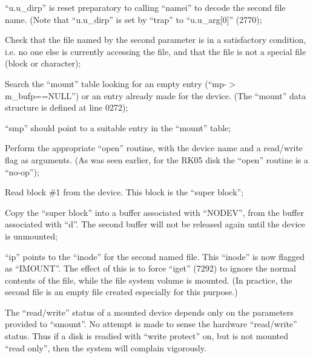 \item[6096:] ``u.u\_dirp'' is  reset  preparatory
to  calling ``namei'' to decode the
second  file  name.   (Note   that
``u.u\_dirp''  is  set  by ``trap'' to
``u.u\_arg[0]'' (2770);

\item[6100:] Check that the file named by  the
      second  parameter  is in a satisfactory condition,  i.e.  no  one
      else  is  currently accessing the
      file, and that the file is not  a
      special  file  (block  or character);

\item[6103:] Search the ``mount'' table  looking
  for      an      empty      entry
(``mp-$>$m\_bufp==NULL'') or an  entry
  already   made  for  the  device.
  (The ``mount''  data  structure  is
  defined at line 0272);


\item[6111:] ``smp'' should point to a  suitable
entry in the ``mount'' table;

\item[6113:] Perform  the  appropriate  ``open''
routine, with the device name and
a read/write flag  as  arguments.
(As  was  seen  earlier,  for the
RK05 disk the ``open'' routine is a
``no-op'');


\item[6116:] Read block \#1 from the device.
This block is the ``super block'';

\item[6124:] Copy the ``super block'' into a
buffer associated with ``NODEV'',
from the buffer associated with
``d''. The second buffer will not
 be released again until the device is unmounted;

\item[6130:] ``ip'' points to  the  ``inode''  for
the   second  named  file.   This
``inode''   is   now   flagged   as
``IMOUNT''.  The  effect of this is
to force ``iget'' (7292) to  ignore
the  normal contents of the file,
while the file system  volume  is
mounted. (In practice, the second
file is  an  empty  file  created
especially for this purpose.)
\ed



\bd
\item[1.] The ``read/write'' status of a mounted
device  depends  only on the parameters
provided to ``smount''.   No  attempt  is
made to sense the hardware ``read/write''
status. Thus if a disk is readied  with
``write  protect'' on, but is not mounted
``read only'', then the system will  complain vigorously.

